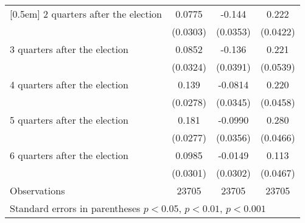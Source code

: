 \begin{table}[!ht]
\begin{tabular}{l*{3}{c}}
[0.5em]
 2 quarters after the election&      0.0775\sym{*}  &      -0.144\sym{***}&       0.222\sym{***}\\
                    &    (0.0303)         &    (0.0353)         &    (0.0422)         \\
[0.5em]
 3 quarters after the election&      0.0852\sym{**} &      -0.136\sym{***}&       0.221\sym{***}\\
                    &    (0.0324)         &    (0.0391)         &    (0.0539)         \\
[0.5em]
 4 quarters after the election&       0.139\sym{***}&     -0.0814\sym{*}  &       0.220\sym{***}\\
                    &    (0.0278)         &    (0.0345)         &    (0.0458)         \\
[0.5em]
 5 quarters after the election&       0.181\sym{***}&     -0.0990\sym{**} &       0.280\sym{***}\\
                    &    (0.0277)         &    (0.0356)         &    (0.0466)         \\
[0.5em]
 6 quarters after the election&      0.0985\sym{**} &     -0.0149         &       0.113\sym{*}  \\
                    &    (0.0301)         &    (0.0302)         &    (0.0467)         \\
\hline
Observations        &       23705         &       23705         &       23705         \\
\hline\hline
\multicolumn{4}{l}{ Standard errors in parentheses \sym{*} \(p<0.05\), \sym{**} \(p<0.01\), \sym{***} \(p<0.001\)}\\
\end{tabular}
\label{app_graph2_coef}
\end{table}
